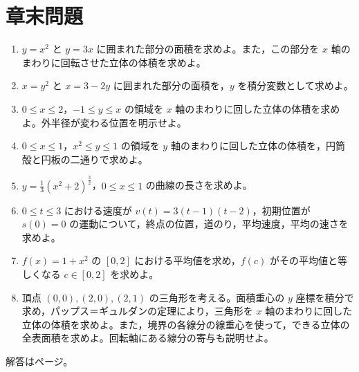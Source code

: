\section*{章末問題}
\begin{enumerate}[label=\textbf{\thechapter.\arabic*},leftmargin=*]
\item\label{問:面積と円環}
$y=x^2$ と $y=3x$ に囲まれた部分の面積を求めよ。また，この部分を $x$ 軸のまわりに回転させた立体の体積を求めよ。
\item\label{問:横帯の面積}
$x=y^2$ と $x=3-2y$ に囲まれた部分の面積を，$y$ を積分変数として求めよ。
\item\label{問:外半径の交代}
$0\leq x\leq2$，$-1\leq y\leq x$ の領域を $x$ 軸のまわりに回した立体の体積を求めよ。外半径が変わる位置を明示せよ。
\item\label{問:円筒と円板}
$0\leq x\leq1$，$x^2\leq y\leq1$ の領域を $y$ 軸のまわりに回した立体の体積を，円筒殻と円板の二通りで求めよ。
\item\label{問:弧長の平方完成}
$y=\frac13(x^2+2)^{\frac32}$，$0\leq x\leq1$ の曲線の長さを求めよ。
\item\label{問:道のりと平均速度}
$0\leq t\leq3$ における速度が $v(t)=3(t-1)(t-2)$，初期位置が $s(0)=0$ の運動について，終点の位置，道のり，平均速度，平均の速さを求めよ。
\item\label{問:平均値を取る点}
$f(x)=1+x^2$ の $[0,2]$ における平均値を求め，$f(c)$ がその平均値と等しくなる $c\in[0,2]$ を求めよ。
\item\label{問:三角形と両パップス}
頂点 $(0,0),(2,0),(2,1)$ の三角形を考える。面積重心の $y$ 座標を積分で求め，パップス＝ギュルダンの定理により，三角形を $x$ 軸のまわりに回した立体の体積を求めよ。また，境界の各線分の線重心を使って，できる立体の全表面積を求めよ。回転軸にある線分の寄与も説明せよ。
\end{enumerate}

\smallskip\noindent 解答は\pageref{解答:第8章}ページ。
